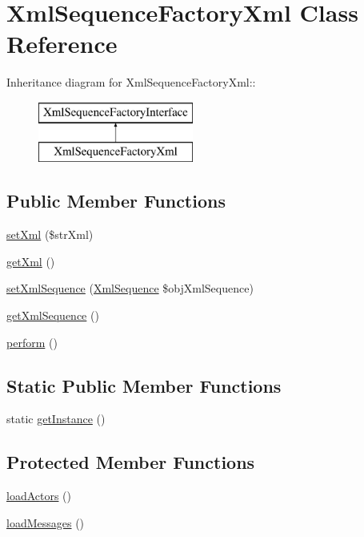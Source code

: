 \hypertarget{class_xml_sequence_factory_xml}{
\section{XmlSequenceFactoryXml Class Reference}
\label{class_xml_sequence_factory_xml}
}
Inheritance diagram for XmlSequenceFactoryXml::\begin{figure}[H]
\begin{center}
\leavevmode
\includegraphics[height=2cm]{class_xml_sequence_factory_xml}
\end{center}
\end{figure}
\subsection*{Public Member Functions}
\begin{CompactItemize}
\item 
\hyperlink{class_xml_sequence_factory_xml_fcd133077830c5da893545402a045ddc}{setXml} (\$strXml)
\item 
\hyperlink{class_xml_sequence_factory_xml_40c24f121f17fb47d4d5424db95a2f95}{getXml} ()
\item 
\hyperlink{class_xml_sequence_factory_xml_c1282bb7211c84aff732419317312152}{setXmlSequence} (\hyperlink{class_xml_sequence}{XmlSequence} \$objXmlSequence)
\item 
\hyperlink{class_xml_sequence_factory_xml_fba8de983895bb05857d75f9b26dd71a}{getXmlSequence} ()
\item 
\hyperlink{class_xml_sequence_factory_xml_f9deb0d1efc6f6e726837251a5759bcc}{perform} ()
\end{CompactItemize}
\subsection*{Static Public Member Functions}
\begin{CompactItemize}
\item 
static \hyperlink{class_xml_sequence_factory_xml_04cfad5bd111c3dd8f264e783ed91328}{getInstance} ()
\end{CompactItemize}
\subsection*{Protected Member Functions}
\begin{CompactItemize}
\item 
\hyperlink{class_xml_sequence_factory_xml_7142e97b8bdea80ec8a3a72f1dbed6d8}{loadActors} ()
\item 
\hyperlink{class_xml_sequence_factory_xml_7b848e420882e9f8fd28979953f32f84}{loadMessages} ()
\end{CompactItemize}
